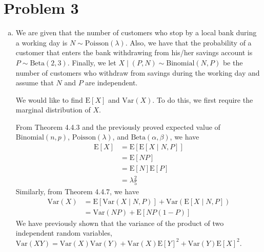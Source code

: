 \documentclass[11pt]{article}
\begin{document}
\newpage

\section*{Problem 3}

\begin{enumerate}[(a)]

\item We are given that the number of customers who stop by a local bank
during a working day is $N \sim \mathrm{Poisson}(\lambda)$.  Also, we
have that the probability of a customer that enters the bank
withdrawing from his/her savings account is $P \sim
\mathrm{Beta}(2,3)$.  Finally, we let $X \mid (P,N) \sim
\mathrm{Binomial}(N,P)$ be the number of customers who withdraw from
savings during the working day and assume that $N$ and $P$ are
independent.

We would like to find $\mathrm{E}[X]$ and $\mathrm{Var}(X)$.  To do
this, we first require the marginal distribution of $X$.

From Theorem 4.4.3 and the previously proved expected value of
$\mathrm{Binomial}(n,p)$, $\mathrm{Poisson}(\lambda)$, and
$\mathrm{Beta}(\alpha, \beta)$, we have
\begin{align*}
  \mathrm{E}[X] &= \mathrm{E}[\mathrm{E}[X \mid N,P]] \\
  &= \mathrm{E}[NP] \\
  &= \mathrm{E}[N] \mathrm{E}[P] \\
  &= \lambda \frac{2}{5}
\end{align*}
Similarly, from Theorem 4.4.7, we have
\begin{align*}
  \mathrm{Var}(X) &= \mathrm{E}[\mathrm{Var}(X \mid N,P)] +
                    \mathrm{Var}(\mathrm{E}[X \mid N,P]) \\
  &= \mathrm{Var}(NP) + \mathrm{E}[NP(1-P)]
\end{align*}
We have previously shown that the variance of the product of two
independent random variables, $\mathrm{Var}(XY) = \mathrm{Var}(X)
\mathrm{Var}(Y) + \mathrm{Var}(X) \mathrm{E}[Y]^2 + \mathrm{Var}(Y)
\mathrm{E}[X]^2$.


\end{enumerate}
\end{document}
